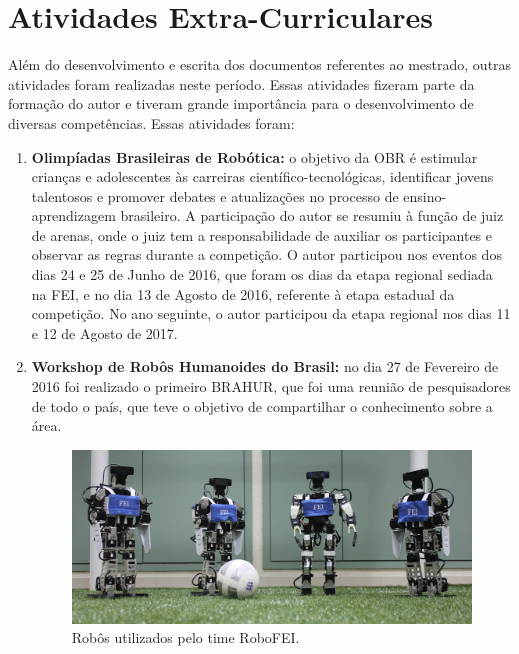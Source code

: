 \documentclass[
  12pt,       %
  oneside,
  a4paper,      %
  english,      %
  french,       %
  spanish,      %
  brazil,       %
  ]{abntex2}
\begin{document}
\section{Atividades Extra-Curriculares}\label{sec:extra}

Além do desenvolvimento e escrita dos documentos referentes ao mestrado, outras atividades foram realizadas neste período.
Essas atividades fizeram parte da formação do autor e tiveram grande importância para o desenvolvimento de diversas competências.
Essas atividades foram:
%
\begin{enumerate}
  \item \textbf{Olimpíadas Brasileiras de Robótica:} o objetivo da OBR é estimular crianças e adolescentes às carreiras científico-tecnológicas, identificar jovens talentosos e promover debates e atualizações no processo de ensino-aprendizagem brasileiro.
  A participação do autor se resumiu à função de juiz de arenas, onde o juiz tem a responsabilidade de auxiliar os participantes e observar as regras durante a competição.
  O autor participou nos eventos dos dias 24 e 25 de Junho de 2016, que foram os dias da etapa regional sediada na FEI, e no dia 13 de Agosto de 2016, referente à etapa estadual da competição.
  No ano seguinte, o autor participou da etapa regional nos dias 11 e 12 de Agosto de 2017.

  \item \textbf{Workshop de Robôs Humanoides do Brasil:} no dia 27 de Fevereiro de 2016 foi realizado o primeiro BRAHUR, que foi uma reunião de pesquisadores de todo o país, que teve o objetivo de compartilhar o conhecimento sobre a área.

\begin{figure}[t]
  \centering
  \caption{Robôs utilizados pelo time RoboFEI.}\label{fig:robo}
    \includegraphics[width=\textwidth]{fig/team-2016}
\end{figure}


\end{enumerate}
\end{document}
